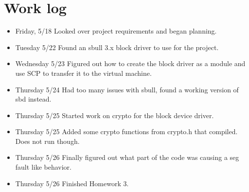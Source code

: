 \documentclass[journal,10pt,onecolumn,letterpaper,draftclsnofoot]{IEEEtran}
\begin{document}
\section{Work log}

\begin{itemize}
\item Friday, 5/18 Looked over project requirements and began planning.
\item Tuesday 5/22 Found an sbull 3.x block driver to use for the project.
\item Wednesday 5/23 Figured out how to create the block driver as a module and use SCP to transfer it to the virtual machine.
\item Thursday 5/24 Had too many issues with sbull, found a working version of sbd instead.
\item Thursday 5/25 Started work on crypto for the block device driver.
\item Thursday 5/25 Added some crypto functions from crypto.h that compiled. Does not run though.
\item Thursday 5/26 Finally figured out what part of the code was causing a seg fault like behavior.
\item Thursday 5/26 Finished Homework 3.
\end{itemize}
\end{document}
